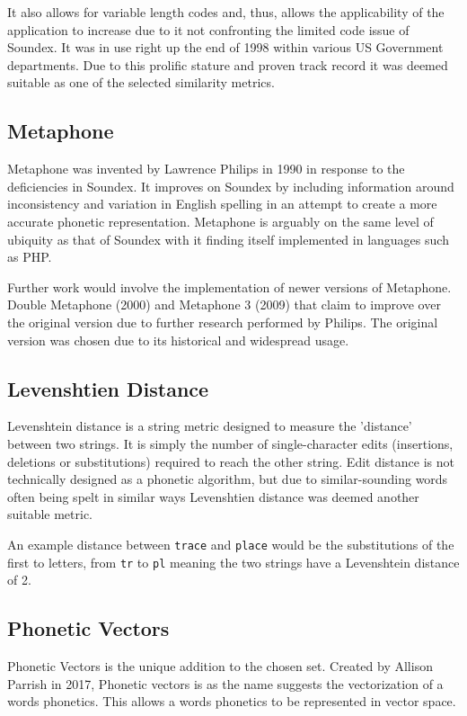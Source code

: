 It also allows for variable length codes and, thus, allows the applicability of the application to increase due to it not confronting the limited code issue of Soundex. It was in use right up the end of 1998 within various US Government departments. Due to this prolific stature and proven track record it was deemed suitable as one of the selected similarity metrics.

\subsection{Metaphone}
Metaphone was invented by Lawrence Philips in 1990\cite{philips1990hanging} in response to the deficiencies in Soundex. It improves on Soundex by including information around inconsistency and variation in English spelling in an attempt to create a more accurate phonetic representation. Metaphone is arguably on the same level of ubiquity as that of Soundex with it finding itself implemented in languages such as PHP\cite{php}. 

Further work would involve the implementation of newer versions of Metaphone. Double Metaphone (2000) and Metaphone 3 (2009) that claim to improve over the original version due to further research performed by Philips. The original version was chosen due to its historical and widespread usage.

\subsection{Levenshtien Distance}
Levenshtein distance is a string metric designed to measure the 'distance' between two strings. It is simply the number of single-character edits (insertions, deletions or substitutions) required to reach the other string. Edit distance is not technically designed as a phonetic algorithm, but due to similar-sounding words often being spelt in similar ways\cite{hettiarachchi2012sparcl} Levenshtien distance was deemed another suitable metric.

An example distance between \verb|trace| and \verb|place| would be the substitutions of the first to letters, from \verb|tr| to \verb|pl| meaning the two strings have a Levenshtein distance of 2.

\subsection{Phonetic Vectors}
Phonetic Vectors is the unique addition to the chosen set. Created by Allison Parrish in 2017\cite{parrish2017poetic}, Phonetic vectors is as the name suggests the vectorization of a words phonetics. This allows a words phonetics to be represented in vector space.

